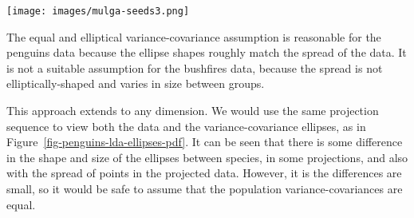 \documentclass[
  letterpaper,
]{krantz}
\newcommand{\insightbox}[1]{%
\noindent\colorbox{insight!30}{%
\begin{minipage}{0.98\textwidth}%
    \centering%
    \begin{minipage}[c]{0.15\textwidth} %
      \texttt{[image: images/mulga-seeds3.png]} %
    \end{minipage}%
    \hfill %
    \begin{minipage}[c]{0.8\textwidth} %
      \bigskip%
      \textsf{#1}%
      \bigskip%
    \end{minipage}%
    \hspace*{3mm}%
  \end{minipage}%
}%
}
\begin{document}
\insightbox{The equal and elliptical variance-covariance assumption is reasonable for the penguins data because the ellipse shapes roughly match the spread of the data. It is not a suitable assumption for the bushfires data, because the spread is not elliptically-shaped and varies in size between groups.}

This approach extends to any dimension. We would use the same projection
sequence to view both the data and the variance-covariance ellipses, as
in Figure~\ref{fig-penguins-lda-ellipses-pdf}. It can be seen that there
is some difference in the shape and size of the ellipses between
species, in some projections, and also with the spread of points in the
projected data. However, it is the differences are small, so it would be
safe to assume that the population variance-covariances are equal.
\end{document}
